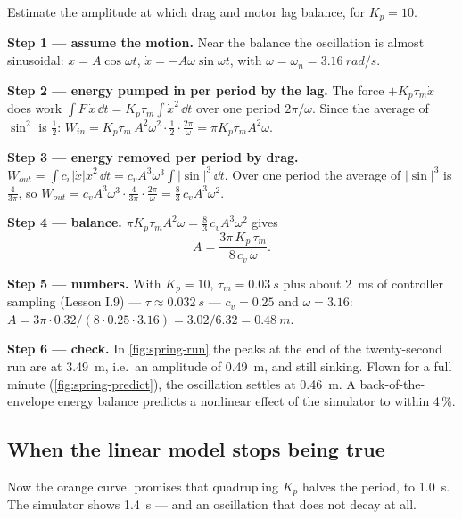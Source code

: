 \begin{example}
\label{ex:spring-limit}
Estimate the amplitude at which drag and motor lag balance, for $K_p = 10$.

\textbf{Step 1 — assume the motion.} Near the balance the oscillation is almost sinusoidal: $x = A\cos\omega t$, $\dot x = -A\omega\sin\omega t$, with $\omega = \omega_n = \SI{3.16}{rad/s}$.

\textbf{Step 2 — energy pumped in per period by the lag.} The force $+K_p\tau_m\dot x$ does work $\int F\,\dot x\,\dd t = K_p\tau_m\int\dot x^2\,\dd t$ over one period $2\pi/\omega$. Since the average of $\sin^2$ is $\tfrac12$: $W_{in} = K_p\tau_m\,A^2\omega^2\cdot\tfrac12\cdot\tfrac{2\pi}{\omega} = \pi K_p\tau_m A^2\omega$.

\textbf{Step 3 — energy removed per period by drag.} $W_{out} = \int c_v|\dot x|\dot x^2\,\dd t = c_v A^3\omega^3\int|\sin|^3\,\dd t$. Over one period the average of $|\sin|^3$ is $\tfrac{4}{3\pi}$, so $W_{out} = c_v A^3\omega^3\cdot\tfrac{4}{3\pi}\cdot\tfrac{2\pi}{\omega} = \tfrac83\,c_v A^3\omega^2$.

\textbf{Step 4 — balance.} $\pi K_p\tau_m A^2\omega = \tfrac83\,c_v A^3\omega^2$ gives
\begin{equation*}
  A = \frac{3\pi\,K_p\,\tau_m}{8\,c_v\,\omega}.
\end{equation*}

\textbf{Step 5 — numbers.} With $K_p = 10$, $\tau_m = \SI{0.03}{s}$ plus about \SI{2}{ms} of controller sampling (Lesson I.9) — $\tau \approx \SI{0.032}{s}$ — $c_v = 0.25$ and $\omega = 3.16$: $A = 3\pi\cdot0.32/(8\cdot0.25\cdot3.16) = 3.02/6.32 = \SI{0.48}{m}$.

\textbf{Step 6 — check.} In \cref{fig:spring-run} the peaks at the end of the twenty-second run are at \SI{3.49}{m}, i.e.\ an amplitude of \SI{0.49}{m}, and still sinking. Flown for a full minute (\cref{fig:spring-predict}), the oscillation settles at \SI{0.46}{m}. A back-of-the-envelope energy balance predicts a nonlinear effect of the simulator to within 4\,\%.
\end{example}

\subsection{When the linear model stops being true}
Now the orange curve.  promises that quadrupling $K_p$ halves the period, to \SI{1.0}{s}. The simulator shows \SI{1.4}{s} — and an oscillation that does not decay at all.

